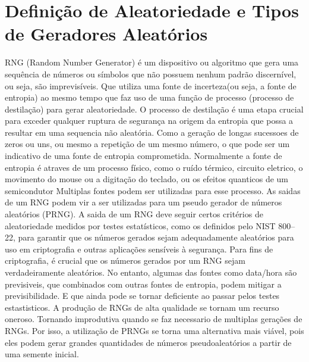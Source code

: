     \section{Definição de Aleatoriedade e Tipos de Geradores Aleatórios}
        RNG (Random Number Generator) é um dispositivo ou algoritmo que gera uma sequência de números ou símbolos que não possuem nenhum padrão discernível, ou seja, são imprevisíveis.
        Que utiliza uma fonte de incerteza(ou seja, a fonte de entropia) ao mesmo tempo que faz uso de uma função de processo (processo de destilação) para gerar aleatoriedade.
        O processo de destilação é uma etapa crucial para exceder qualquer ruptura de segurança na origem da entropia que possa a resultar em uma sequencia não aleatória.
        Como a geração de longas sucessoes de zeros ou uns, ou mesmo a repetição de um mesmo número, o que pode ser um indicativo de uma fonte de entropia comprometida.
        Normalmente a fonte de entropia é atraves de um processo físico, como o ruído térmico, circuito eletrico, o movimento do mouse ou a digitação do teclado, ou os efeitos quanticos de um semicondutor%
        Multiplas fontes podem ser utilizadas para esse processo. As saidas de um RNG podem vir a ser utilizadas para um pseudo gerador de números aleatórios (PRNG). 
        A saida de um RNG deve seguir certos critérios de aleatoriedade medidos por testes estatísticos, como os definidos pelo NIST 800--22, 
        para garantir que os números gerados sejam adequadamente aleatórios para uso em criptografia e outras aplicações sensíveis à segurança.
        Para fins de criptografia, é crucial que os números gerados por um RNG sejam verdadeiramente aleatórios. No entanto, algumas das fontes como data/hora são previsiveis, 
        que combinados com outras fontes de entropia, podem mitigar a previsibilidade. E que ainda pode se tornar deficiente ao passar pelos testes estastisticos. A produção de RNGs de alta qualidade se tornam um recurso oneroso.
        Tornando improdutiva quando se faz necessario de multiplas gerações de RNGs. 
        Por isso, a utilização de PRNGs se torna uma alternativa mais viável, pois eles podem gerar grandes quantidades de números pseudoaleatórios a partir de uma semente inicial.

